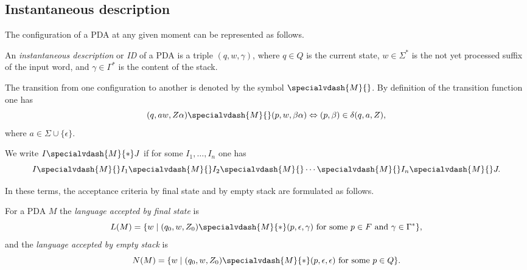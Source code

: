 \begin{page}

\subsection{Instantaneous description}
The configuration of a PDA at any given moment can be represented as follows.


\end{page}

\begin{page}

\begin{dfn}
An \emph{instantaneous description} or \emph{ID} of a PDA is a triple $(q, w, \gamma)$,
where $q \in Q$ is the current state, $w \in \Sigma^*$ is the not yet processed suffix of the input word,
and $\gamma \in \Gamma^*$ is the content of the stack.
\end{dfn}

\end{page}

\begin{page}


The transition from one configuration to another is denoted by the symbol $\specialvdash{M}{}$.
By definition of the transition function one has
\[
(q, aw, Z\alpha) \specialvdash{M}{} (p, w, \beta\alpha) \Leftrightarrow (p, \beta) \in \delta(q, a, Z),
\]
where $a \in \Sigma \cup \{\epsilon\}$.

We write $I \specialvdash{M}{*} J$ if for some $I_1, \ldots, I_n$ one has
\[
I \specialvdash{M}{} I_1 \specialvdash{M}{} I_2 \specialvdash{M}{} \cdots \specialvdash{M}{} I_n \specialvdash{M}{} J.
\]

In these terms, the acceptance criteria by final state and by empty stack are formulated as follows.


\end{page}

\begin{page}

\begin{dfn}
For a PDA $M$ the \emph{language accepted by final state} is
\[
L(M) = \{w \mid (q_0, w, Z_0) \specialvdash{M}{*} (p, \epsilon, \gamma) \text{ for some }p \in F \text{ and } \gamma \in \Gamma^*\},
\]
and the \emph{language accepted by empty stack} is
\[
N(M) = \{w \mid (q_0, w, Z_0) \specialvdash{M}{*} (p, \epsilon, \epsilon) \text{ for some }p \in Q\}.
\]
\end{dfn}

\end{page}

